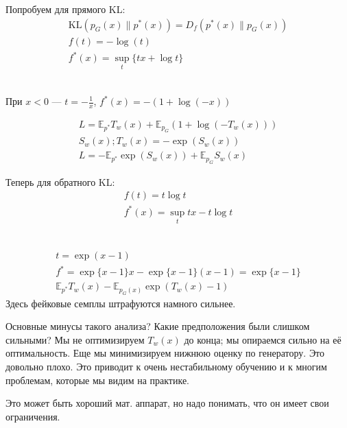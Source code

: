 \documentclass{book}
\begin{document}
    Попробуем для прямого KL:
    \begin{gather*}
        \mathrm{KL}(p_G(x)\|p^*(x))=D_f(p^*(x)\|p_G(x))\\
        f(t)=-\log(t)\\
        f^*(x)=\sup_t\{tx+\log t\}
    \end{gather*}
    \\
    При $x<0$ --- $t=-\frac{1}{x}$, $ f^*(x)=-(1+\log(-x))$

    \begin{gather*}
        L=\mathbb{E}_{p^*}T_w(x)+\mathbb{E}_{p_G}(1+\log(-T_w(x)))\\
        S_w(x); T_w(x)=-\exp(S_w(x)) \\
        L=-\mathbb{E}_{p^*} \exp(S_w(x))+\mathbb{E}_{p_G}S_w(x)
    \end{gather*}

    Теперь для обратного KL:
    \begin{gather*}
        f(t)=t\log t\\
        f^*(x)=\sup_t{tx-t\log t}
    \end{gather*}
    \\
    \begin{gather*}
        t=\exp(x-1)\\
        f^*=\exp\{x-1\}x-\exp\{x-1\}(x-1)=\exp\{x-1\}\\
        \mathbb{E}_{p^*}T_w(x)-\mathbb{E}_{p_G(x)}\exp(T_w(x)-1)
    \end{gather*}
    Здесь фейковые семплы штрафуются намного сильнее.

    Основные минусы такого анализа? Какие предположения были слишком сильными? Мы не оптимизируем $T_w(x)$ до конца; мы опираемся сильно на её оптимальность. Еще мы минимизируем нижнюю оценку по генератору.
    Это довольно плохо. Это приводит к очень нестабильному обучению и к многим проблемам, которые мы видим на практике.

    Это может быть хороший мат. аппарат, но надо понимать, что он имеет свои ограничения.
\end{document}
